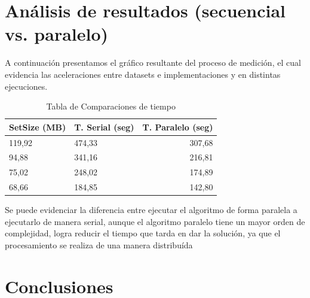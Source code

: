 \documentclass[fleqn,10pt]{SelfArx} %
\begin{document}
\section{Análisis de resultados (secuencial vs. paralelo)}

A continuación presentamos el gráfico resultante del proceso de medición, el cual evidencia las aceleraciones entre datasets e implementaciones y en distintas ejecuciones.

\begin{table}[hbt]
	\caption{Tabla de Comparaciones de tiempo}
	\centering
	\begin{tabular}{llr}
		\cmidrule(r){1-3}
		SetSize (MB) & T. Serial (seg) & T. Paralelo (seg)\\
		\midrule
		
		119,92 & 474,33 & 307,68 \\
		
		94,88 & 341,16 & 216,81 \\
		
		75,02 & 248,02 & 174,89 \\
		
		68,66 & 184,85 & 142,80 \\
		
		\bottomrule
	\end{tabular}
	\label{tab:label}
\end{table}


Se puede evidenciar la diferencia entre ejecutar el algoritmo de forma paralela a ejecutarlo de manera serial, aunque el algoritmo paralelo tiene un mayor orden de complejidad, logra reducir el tiempo que tarda en dar la solución, ya que el procesamiento se realiza de una manera distribuída




\section*{Conclusiones} %

\end{document}
